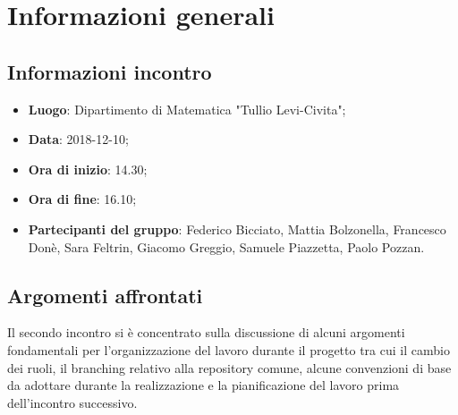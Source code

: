 \section{Informazioni generali}

\subsection{Informazioni incontro}
\begin{itemize}
\item \textbf{Luogo}: Dipartimento di Matematica "Tullio Levi-Civita";
\item \textbf{Data}: 2018-12-10;
\item \textbf{Ora di inizio}: 14.30;
\item \textbf{Ora di fine}: 16.10;
\item \textbf{Partecipanti del gruppo}: Federico Bicciato, Mattia Bolzonella, 
Francesco Donè, Sara Feltrin, Giacomo Greggio, Samuele Piazzetta, Paolo Pozzan.
\end{itemize}

\subsection{Argomenti affrontati}
Il secondo incontro si è concentrato sulla discussione di alcuni argomenti fondamentali per l'organizzazione del lavoro durante il progetto tra cui il cambio dei ruoli, il branching relativo alla repository comune, alcune convenzioni di base da adottare durante la realizzazione e la pianificazione del lavoro prima dell'incontro successivo.
